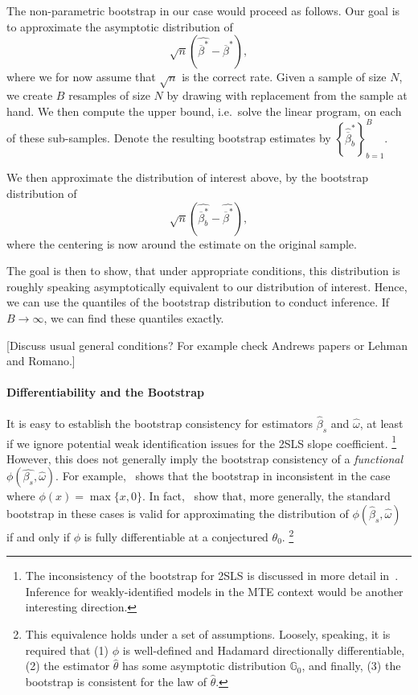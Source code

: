 \documentclass[12pt,a4paper,english]{article} %
\numberwithin{equation}{section}
\theoremstyle{definition}
\theoremstyle{remark}
\theoremstyle{plain}
\begin{document}
The non-parametric bootstrap in our case would proceed as follows.
Our goal is to approximate the asymptotic distribution of
\begin{equation*}
  \sqrt{n}\left(\hat{\overline{\beta}^*} - \overline{\beta}^*\right),
\end{equation*}
where we for now assume that $\sqrt{n}$ is the correct rate.
Given a sample of size $N$, we create $B$ resamples of size $N$ by drawing with replacement from the sample at hand.
We then compute the upper bound, i.e.\ solve the linear program, on each of these sub-samples.
Denote the resulting bootstrap estimates by $\left\{\hat{\overline{\beta}}_b^*\right\}_{b=1}^B$.

We then approximate the distribution of interest above, by the bootstrap distribution of
\begin{equation*}
  \sqrt{n}\left(\hat{\overline{\beta}^*_b} - \hat{\overline{\beta}^*}\right),
\end{equation*}
where the centering is now around the estimate on the original sample.

The goal is then to show, that under appropriate conditions, this distribution is roughly speaking asymptotically equivalent to our distribution of interest.
Hence, we can use the quantiles of the bootstrap distribution to conduct inference.
If $B\to\infty$, we can find these quantiles exactly.

[Discuss usual general conditions? For example check Andrews papers or Lehman and Romano.]

\paragraph{Differentiability and the Bootstrap}
It is easy to establish the bootstrap consistency for estimators $\hat{\beta}_s$ and $\hat{\omega}$, at least if we ignore potential weak identification issues for the 2SLS slope coefficient.
\footnote{
  The inconsistency of the bootstrap for 2SLS is discussed in more detail in~\cite{andrews2010applications}.
  Inference for weakly-identified models in the MTE context would be another interesting direction.
}
However, this does not generally imply the bootstrap consistency of a \textit{functional} $\phi(\hat{\beta_s}, \hat{\omega})$.
For example,~\cite{andrews2000inconsistency} shows that the bootstrap in inconsistent in the case where $\phi(x) = \max\{x, 0\}$.
In fact,~\cite{fang2019infdirdiff} show that, more generally, the standard bootstrap in these cases is valid for approximating the distribution of $\phi(\hat{\beta}_s, \hat{\omega})$ if and only if $\phi$ is fully differentiable at a conjectured $\theta_0$.
\footnote{
  This equivalence holds under a set of assumptions. Loosely, speaking, it is required that
  (1) $\phi$ is well-defined and Hadamard directionally differentiable,
  (2) the estimator $\hat{\theta}$ has some asymptotic distribution $\mathbb{G}_0$, and finally,
  (3) the bootstrap is consistent for the law of $\hat{\theta}$.
}
\end{document}
